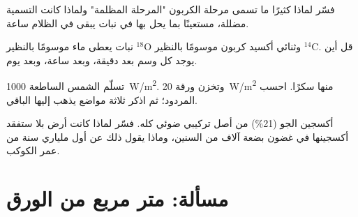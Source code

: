 \begin{exercise}[$\star\star\star$]\label{exo:g12:photosynthesis:12}
فسّر لماذا كثيرًا ما تسمى مرحلة الكربون "المرحلة المظلمة" ولماذا كانت
التسمية مضللة، مستعينًا بما يحل بها في نبات يبقى في الظلام ساعة.
\end{exercise}

\begin{exercise}[$\star\star\star$]\label{exo:g12:photosynthesis:13}
نبات يعطى ماء موسومًا بالنظير $^{18}$O وثنائي أكسيد كربون موسومًا
بالنظير $^{14}$C. قل أين يوجد كل وسم بعد دقيقة، وبعد ساعة، وبعد يوم.
\end{exercise}

\begin{exercise}[$\star\star\star$]\label{exo:g12:photosynthesis:14}
تسلّم الشمس الساطعة \qty{1000}{W/m^2}. وتخزن ورقة \qty{20}{W/m^2}
منها سكرًا. احسب المردود؛ ثم اذكر ثلاثة مواضع يذهب إليها الباقي.
\end{exercise}

\begin{exercise}[$\star\star\star$]\label{exo:g12:photosynthesis:15}
أكسجين الجو (21\%) من أصل تركيبي ضوئي كله. فسّر لماذا كانت أرض بلا
 ستفقد أكسجينها في غضون بضعة آلاف من السنين، وماذا يقول ذلك
عن أول ملياري سنة من عمر الكوكب.
\end{exercise}

\section{مسألة: متر مربع من الورق}

